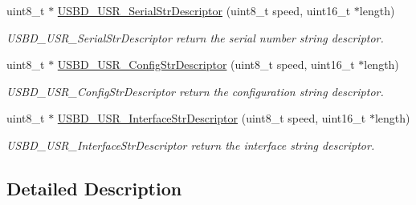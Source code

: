 \begin{DoxyCompactItemize}
uint8\-\_\-t $\ast$ \hyperlink{group__USBD__DESC__Private__Functions_ga61caa6dd47de36f32d25e2d6980e5904}{U\-S\-B\-D\-\_\-\-U\-S\-R\-\_\-\-Serial\-Str\-Descriptor} (uint8\-\_\-t speed, uint16\-\_\-t $\ast$length)
\begin{DoxyCompactList}\small\item\em U\-S\-B\-D\-\_\-\-U\-S\-R\-\_\-\-Serial\-Str\-Descriptor return the serial number string descriptor. \end{DoxyCompactList}\item 
uint8\-\_\-t $\ast$ \hyperlink{group__USBD__DESC__Private__Functions_ga1a95bda8d761cd993c82234e043270fc}{U\-S\-B\-D\-\_\-\-U\-S\-R\-\_\-\-Config\-Str\-Descriptor} (uint8\-\_\-t speed, uint16\-\_\-t $\ast$length)
\begin{DoxyCompactList}\small\item\em U\-S\-B\-D\-\_\-\-U\-S\-R\-\_\-\-Config\-Str\-Descriptor return the configuration string descriptor. \end{DoxyCompactList}\item 
uint8\-\_\-t $\ast$ \hyperlink{group__USBD__DESC__Private__Functions_gaf7003c494f598dd781416da3e468e615}{U\-S\-B\-D\-\_\-\-U\-S\-R\-\_\-\-Interface\-Str\-Descriptor} (uint8\-\_\-t speed, uint16\-\_\-t $\ast$length)
\begin{DoxyCompactList}\small\item\em U\-S\-B\-D\-\_\-\-U\-S\-R\-\_\-\-Interface\-Str\-Descriptor return the interface string descriptor. \end{DoxyCompactList}\end{DoxyCompactItemize}


\subsection{Detailed Description}


